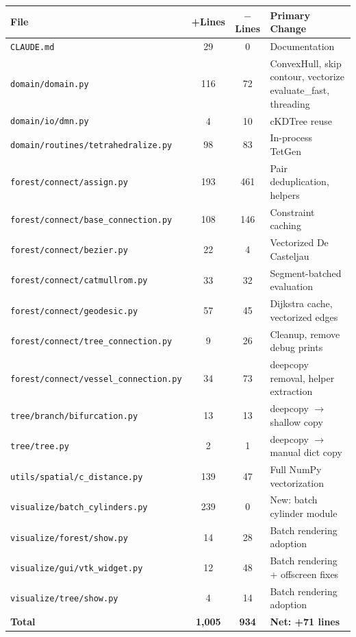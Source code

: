 \documentclass[11pt,a4paper]{article}
\begin{document}
\begin{longtable}{p{5cm}ccp{4.5cm}}
\toprule
\textbf{File} & \textbf{+Lines} & \textbf{$-$Lines} & \textbf{Primary Change} \\
\midrule
\endhead
\texttt{CLAUDE.md} & 29 & 0 & Documentation \\
\texttt{domain/domain.py} & 116 & 72 & ConvexHull, skip contour, vectorize evaluate\_fast, threading \\
\texttt{domain/io/dmn.py} & 4 & 10 & cKDTree reuse \\
\texttt{domain/routines/tetrahedralize.py} & 98 & 83 & In-process TetGen \\
\texttt{forest/connect/assign.py} & 193 & 461 & Pair deduplication, helpers \\
\texttt{forest/connect/base\_connection.py} & 108 & 146 & Constraint caching \\
\texttt{forest/connect/bezier.py} & 22 & 4 & Vectorized De Casteljau \\
\texttt{forest/connect/catmullrom.py} & 33 & 32 & Segment-batched evaluation \\
\texttt{forest/connect/geodesic.py} & 57 & 45 & Dijkstra cache, vectorized edges \\
\texttt{forest/connect/tree\_connection.py} & 9 & 26 & Cleanup, remove debug prints \\
\texttt{forest/connect/vessel\_connection.py} & 34 & 73 & deepcopy removal, helper extraction \\
\texttt{tree/branch/bifurcation.py} & 13 & 13 & deepcopy $\to$ shallow copy \\
\texttt{tree/tree.py} & 2 & 1 & deepcopy $\to$ manual dict copy \\
\texttt{utils/spatial/c\_distance.py} & 139 & 47 & Full NumPy vectorization \\
\texttt{visualize/batch\_cylinders.py} & 239 & 0 & New: batch cylinder module \\
\texttt{visualize/forest/show.py} & 14 & 28 & Batch rendering adoption \\
\texttt{visualize/gui/vtk\_widget.py} & 12 & 48 & Batch rendering + offscreen fixes \\
\texttt{visualize/tree/show.py} & 4 & 14 & Batch rendering adoption \\
\midrule
\textbf{Total} & \textbf{1,005} & \textbf{934} & \textbf{Net: +71 lines} \\
\bottomrule
\end{longtable}

\end{document}
